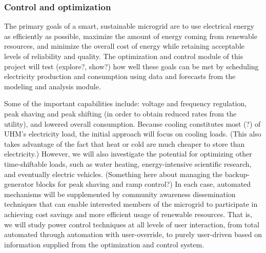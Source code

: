 
\subsubsection{Control and optimization}

The primary goals of a smart, sustainable microgrid are to use electrical
energy as efficiently as possible, maximize the amount of energy coming
from renewable resources, and minimize the overall cost of energy while
retaining acceptable levels of reliability and quality. The optimization
and control module of this project will test (explore?, show?) how well
these goals can be met by scheduling electricity production and consumption
using data and forecasts from the modeling and analysis module.

Some of the important capabilities include: voltage and frequency
regulation, peak shaving and peak shifting (in order to obtain reduced
rates from the utility), and lowered overall consumption. Because cooling
constitutes most (?) of UHM's electricity load, the initial approach will
focus on cooling loads. (This also takes advantage of the fact that heat or
cold are much cheaper to store than electricity.) However, we will also
investigate the potential for optimizing other time-shiftable loads, such
as water heating, energy-intensive scientific research, and eventually
electric vehicles. (Something here about managing the backup-generator
blocks for peak shaving and ramp control?) In each case, automated
mechanisms will be supplemented by community awareness dissemination
techniques that can enable interested members of the microgrid to
participate in achieving cost savings and more efficient usage of renewable
resources. That is, we will study power control techniques at all levels of
user interaction, from total automated through automation with
user-override, to purely user-driven based on information supplied from the
optimization and control system.

